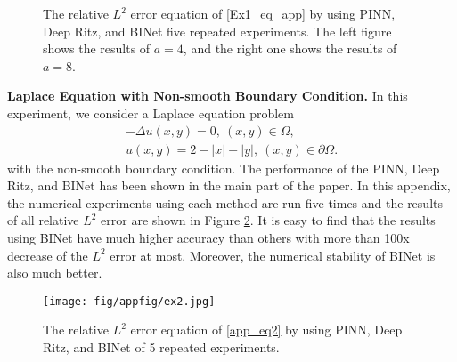 \documentclass[hyperref]{article}
\numberwithin{equation}{section}
\theoremstyle{nonumberplain}
\begin{document}
	\begin{figure}[t]
		\centering
		
		\centering
		\caption{The relative $L^2$ error equation of \eqref{Ex1_eq_app} by using PINN, Deep Ritz, and BINet five repeated experiments. The left figure shows the results of $a=4$, and the right one shows the results of $a=8$.}
		\label{fig:app1}
	\end{figure}
	
	
	
	\textbf{Laplace Equation with Non-smooth Boundary Condition.} In this experiment, we consider a Laplace equation problem
	\begin{equation}
		\begin{aligned}
			-\Delta u(x,y)=0,\ (x,y)\in\Omega,\\
			u(x,y) = 2-|x|-|y|, \ (x,y)\in\partial\Omega.
		\end{aligned}
		\label{app_eq2}
	\end{equation}
	with the non-smooth boundary condition.  The performance of the PINN, Deep Ritz, and BINet has been shown in the main part of the paper. In this appendix, the numerical experiments using each method are run five times and the results of all relative $L^2$ error are shown in Figure \ref{fig:app2}. It is easy to find that the results using BINet have much higher accuracy than others with more than 100x decrease of the $L^2$ error at most. Moreover, the numerical stability of BINet is also much better.
	
	\begin{figure}[t]
		\centering
		\centering
		\texttt{[image: fig/appfig/ex2.jpg]}
		\centering
		\caption{The relative $L^2$ error equation of \eqref{app_eq2} by using PINN, Deep Ritz, and BINet of 5 repeated experiments.}
		\label{fig:app2}
	\end{figure}
	
\end{document}
